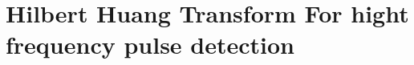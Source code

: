 \documentclass[../Main/thesis.tex]{subfiles}
\begin{document}
\chapter[Hilbert Huang Transform For hight frequency pulse detection]{Hilbert Huang Transform For hight frequency pulse detection}
\label{sec:hht}




\blankpage
\end{document}
